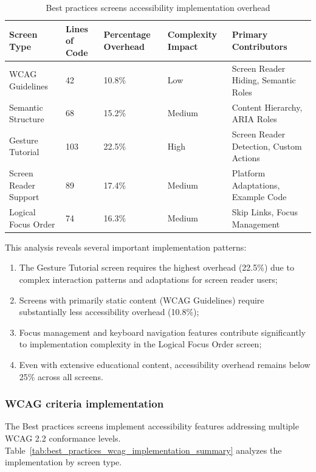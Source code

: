 \begin{table}[ht]
\caption{Best practices screens accessibility implementation overhead}
\label{tab:best_practices_screens_overhead_summary}
\centering
\begin{tabular}[c]{|C{2.5cm}|C{2cm}|C{2.8cm}|C{2.8cm}|C{4.7cm}|}
\hline
\textbf{Screen Type} & \textbf{Lines of Code} & \textbf{Percentage Overhead} & \textbf{Complexity Impact} & \textbf{Primary Contributors} \\
\hline
WCAG Guidelines & 42 & 10.8\% & Low & Screen Reader Hiding, Semantic Roles \\
\hline
Semantic Structure & 68 & 15.2\% & Medium & Content Hierarchy, ARIA Roles \\
\hline
Gesture Tutorial & 103 & 22.5\% & High & Screen Reader Detection, Custom Actions \\
\hline
Screen Reader Support & 89 & 17.4\% & Medium & Platform Adaptations, Example Code \\
\hline
Logical Focus Order & 74 & 16.3\% & Medium & Skip Links, Focus Management \\
\hline
\end{tabular}
\end{table}
\FloatBarrier

This analysis reveals several important implementation patterns:
\begin{enumerate}
    \item The Gesture Tutorial screen requires the highest overhead (22.5\%) due to complex interaction patterns and adaptations for screen reader users;
    
    \item Screens with primarily static content (WCAG Guidelines) require substantially less accessibility overhead (10.8\%);
    
    \item Focus management and keyboard navigation features contribute significantly to implementation complexity in the Logical Focus Order screen;
    
    \item Even with extensive educational content, accessibility overhead remains below 25\% across all screens.
\end{enumerate}

\subsubsection{WCAG criteria implementation}
\label{subsubsec:best-practices-wcag-implementation-summary}
The Best practices screens implement accessibility features addressing multiple WCAG 2.2 conformance levels. Table~\ref{tab:best_practices_wcag_implementation_summary} analyzes the implementation by screen type.


